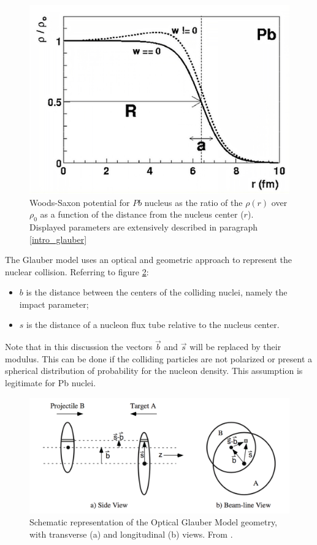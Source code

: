 \begin{figure}[!h]
\begin{center}
\includegraphics[width=0.7\linewidth]{Chapters/Analysis/Figs/woods-saxon.pdf}
\caption{Woods-Saxon potential for $Pb$ nucleus as the ratio of the $\rho(r)$ over $\rho_0$ as a function of the distance from the nucleus center ($r$).
Displayed parameters are extensively described in paragraph \ref{intro_glauber}}
\label{fig:WoodsSaxon}
\end{center}
\end{figure}

The Glauber model uses an optical and geometric approach to represent the nuclear collision.
Referring to figure \ref{fig:GlauberSide}:
\begin{itemize}
\item $b$ is the distance between the centers of the colliding nuclei, namely the impact parameter;
\item $s$ is the distance of a nucleon flux tube relative to the nucleus center.
\end{itemize}
Note that in this discussion the vectors $\vec{b}$ and $\vec{s}$ will be replaced by their modulus.
This can be done if the colliding particles are not polarized or present a spherical distribution of probability for the nucleon density.
This assumption is legitimate for Pb nuclei.

\begin{figure}[!h]
\begin{center}
\includegraphics[width=0.85\linewidth]{Chapters/Analysis/Figs/glauber-side.pdf}
\caption{Schematic representation of the Optical Glauber Model geometry, with transverse (a) and longitudinal (b) views. From \cite{Miller:2007ri}.}
\label{fig:GlauberSide}
\end{center}
\end{figure}

